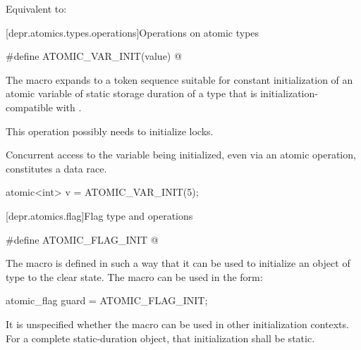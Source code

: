 \begin{itemdescr}
\pnum
\effects
Equivalent to: 
\end{itemdescr}

[depr.atomics.types.operations]{Operations on atomic types}

%
\begin{itemdecl}
#define ATOMIC_VAR_INIT(value) @\seebelow@
\end{itemdecl}

\begin{itemdescr}
\pnum
The macro expands to a token sequence suitable for constant initialization of
an atomic variable of static storage duration of a type that
is initialization-compatible with .
\begin{note}
This operation possibly needs to initialize locks.
\end{note}
Concurrent access to the variable being initialized,
even via an atomic operation,
constitutes a data race.
\begin{example}
\begin{codeblock}
atomic<int> v = ATOMIC_VAR_INIT(5);
\end{codeblock}
\end{example}
\end{itemdescr}

[depr.atomics.flag]{Flag type and operations}

%
\begin{itemdecl}
#define ATOMIC_FLAG_INIT @\seebelow@
\end{itemdecl}

\begin{itemdescr}
\pnum
\remarks
The macro  is defined in such a way that
it can be used to initialize an object of type 
to the clear state.
The macro can be used in the form:
\begin{codeblock}
atomic_flag guard = ATOMIC_FLAG_INIT;
\end{codeblock}
It is unspecified whether the macro can be used
in other initialization contexts.
For a complete static-duration object, that initialization shall be static.
\end{itemdescr}
